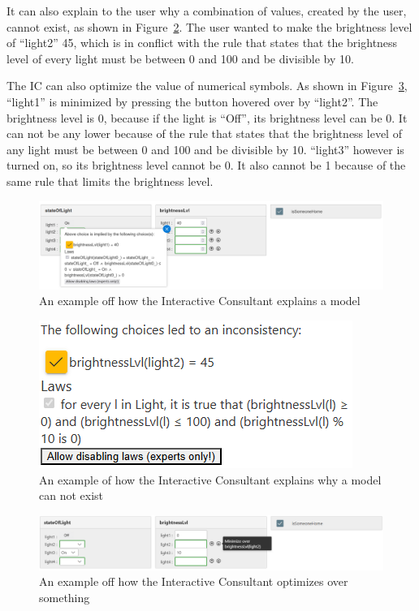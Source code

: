 \documentclass[11pt,a4paper]{report}
\begin{document}
It can also explain to the user why a combination of values, created by the user, cannot exist, as shown in Figure~\ref{fig:IDP-Z3_interactive-consultant_error-example}. The user wanted to make the brightness level of ``light2'' 45, which is in conflict with the rule that states that the brightness level of every light must be between 0 and 100 and be divisible by 10.

The IC can also optimize the value of numerical symbols. As shown in Figure~\ref{fig:IDP-Z3_interactive-consultant_optimization-example}, ``light1'' is minimized by pressing the button hovered over by ``light2''. The brightness level is 0, because if the light is ``Off'', its brightness level can be 0. It can not be any lower because of the rule that states that the brightness level of any light must be between 0 and 100 and be divisible by 10. ``light3'' however is turned on, so its brightness level cannot be 0. It also cannot be 1 because of the same rule that limits the brightness level.

\begin{figure}
    \centering
    \includegraphics[width=0.8\linewidth]{images/IDP-Z3_interactive-consultant_light-example.png}
    \caption{An example off how the Interactive Consultant explains a model}
    \label{fig:IDP-Z3_interactive-consultant_light-example}
\end{figure}

\begin{figure}
    \centering
    \includegraphics[width=0.4\linewidth]{images/IDP-Z3_interactive-consultant_error-example.png}
    \caption{An example of how the Interactive Consultant explains why a model can not exist}
    \label{fig:IDP-Z3_interactive-consultant_error-example}
\end{figure}

\begin{figure}
    \centering
    \includegraphics[width=0.8\linewidth]{images/IDP-Z3_interactive-consultant_optimization-example.png}
    \caption{An example off how the Interactive Consultant optimizes over something}
    \label{fig:IDP-Z3_interactive-consultant_optimization-example}
\end{figure}
\end{document}
